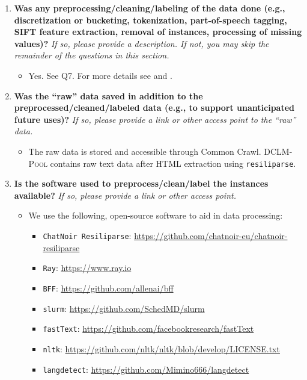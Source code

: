 \documentclass{article}
\newcommand{\rawpool}{\textsc{DCLM-Pool}\xspace}
\newcommand{\resiliparse}{\texttt{resiliparse}\xspace}
\newcommand{\fasttext}{\texttt{fastText}\xspace}
\newcommand{\commoncrawl}{Common Crawl\xspace}
\begin{document}
\begin{enumerate}[label=Q\arabic*, resume]

\item \textbf{Was any preprocessing/cleaning/labeling of the data done (e.g., discretization or bucketing, tokenization, part-of-speech tagging, SIFT feature extraction, removal of instances, processing of missing values)?} \textit{If so, please provide a description. If not, you may skip the remainder of the questions in this section.}

\begin{itemize}
\item Yes. See Q7.
For more details see  and .
\end{itemize}

\item \textbf{Was the “raw” data saved in addition to the preprocessed/cleaned/labeled data (e.g., to support unanticipated future uses)?} \textit{If so, please provide a link or other access point to the “raw” data.}

\begin{itemize}
\item The raw data is stored and accessible through \commoncrawl. \rawpool contains raw text data after HTML extraction using \resiliparse.
\end{itemize}



\item \textbf{Is the software used to preprocess/clean/label the instances available?} \textit{If so, please provide a link or other access point.}


\begin{itemize}
\item We use the following, open-source software to aid in data processing:
\begin{itemize}
\item \texttt{ChatNoir Resiliparse}: \url{https://github.com/chatnoir-eu/chatnoir-resiliparse}
\item \texttt{Ray}: \url{https://www.ray.io}
\item \texttt{BFF}: \url{https://github.com/allenai/bff}
\item \texttt{slurm}: \url{https://github.com/SchedMD/slurm}
\item \fasttext: \url{https://github.com/facebookresearch/fastText}
\item \texttt{nltk}: \url{https://github.com/nltk/nltk/blob/develop/LICENSE.txt}
\item \texttt{langdetect}: \url{https://github.com/Mimino666/langdetect}


\end{itemize}
\end{itemize}
\end{enumerate}
\end{document}
